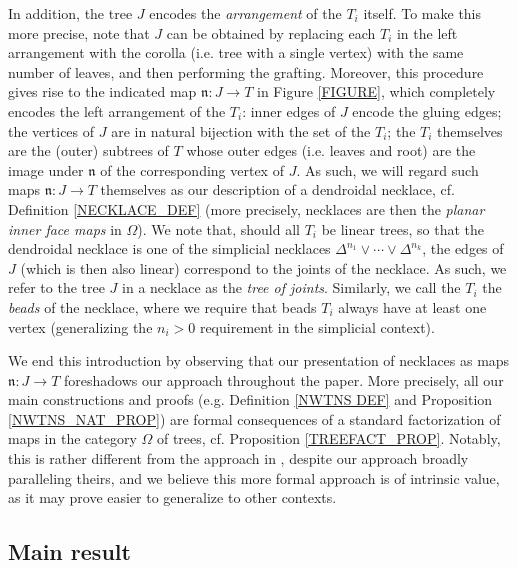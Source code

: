 \documentclass[a4paper,10pt]{article}%
\numberwithin{equation}{section}
\numberwithin{figure}{section}
\theoremstyle{definition} %
\begin{document}
In addition, the tree $J$ encodes the \emph{arrangement}
of the $T_i$ itself. 
To make this more precise,
note that $J$ can be obtained by replacing each $T_i$ 
in the left arrangement with the corolla (i.e. tree with a single vertex) with the same number of leaves,
and then performing the grafting.
Moreover, this procedure gives rise to the indicated map
$\mathfrak{n} \colon J \to T$
in Figure \ref{FIGURE},
which completely encodes the left arrangement of the $T_i$: 
inner edges of $J$ encode the gluing edges;
the vertices of $J$ are in natural bijection with the set of the $T_i$; the $T_i$ themselves are the (outer) subtrees of $T$ whose outer edges (i.e. leaves and root)
are the image under $\mathfrak{n}$
of the corresponding vertex of $J$.
As such, we will regard such maps 
$\mathfrak{n} \colon J \to T$ themselves 
as our description of a dendroidal necklace,
cf. Definition \ref{NECKLACE_DEF}
(more precisely, necklaces are then the 
\emph{planar inner face maps} in $\Omega$).
We note that, should all $T_i$ be linear trees, so that the dendroidal necklace is one of the simplicial necklaces
$\Delta^{n_1} \vee \cdots \vee \Delta^{n_k}$,
the edges of $J$ (which is then also linear) correspond to the joints of the necklace. 
As such, we refer to the tree $J$ in a necklace as the 
\emph{tree of joints}. Similarly, we call the $T_i$ the \emph{beads} of the necklace, where we require that beads $T_i$ always have at least one vertex (generalizing the $n_i>0$ requirement in the simplicial context).

We end this introduction by observing that our presentation of necklaces as maps $\mathfrak{n} \colon J \to T$
foreshadows our approach throughout the paper.
More precisely, all our main constructions and proofs
(e.g. Definition \ref{NWTNS DEF} and
Proposition \ref{NWTNS_NAT_PROP})
are formal consequences of a standard factorization of maps in the category $\Omega$ of trees, cf. Proposition \ref{TREEFACT_PROP}.
Notably, this is rather different from the approach in \cite{DS11},
despite our approach broadly paralleling theirs,
and we believe this more formal approach is of intrinsic value,
as it may prove easier to generalize to other contexts.




\subsection{Main result}
\label{MAINRESULT_SEC}
\end{document}
